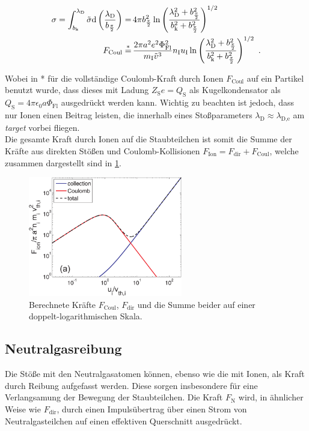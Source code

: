 \documentclass[numbers=noenddot,a4paper]{scrartcl}
\newcommand{\diff}{\textnormal{d}}
\newcommand{\ix}[1]{_\text{#1}}
\newcommand{\tilt}[1]{\textit{#1}}
\begin{document}
					\begin{align}
						\sigma=\int_{b\ix{k}}^{\lambda\ix{D}}\tilde{\sigma}\diff\left(\frac{\lambda\ix{D}}{b_{\frac{\pi}{2}}}\right)=&\,4\pi b_{\frac{\pi}{2}}^2\ln\left(\frac{\lambda\ix{D}^2+b_{\frac{\pi}{2}}^2}{b\ix{k}^2+b_{\frac{\pi}{2}}^2}\right)^{1/2} \nonumber \\
						F\ix{Coul}\overset{*}{=}&\,\frac{2\pi a^2 e^2\Phi\ix{Fl}^2}{m\ix{I}\tilde{v}^3}n\ix{I}u\ix{I}\ln\left(\frac{\lambda\ix{D}^2+b_{\frac{\pi}{2}}^2}{b\ix{k}^2+b_{\frac{\pi}{2}}^2}\right)^{1/2} \, \, .
					\end{align}
					
				Wobei in * für die vollständige Coulomb-Kraft durch Ionen $F\ix{Coul}$ auf ein Partikel benutzt wurde, dass dieses mit Ladung $Z\ix{S}e=Q\ix{S}$ als Kugelkondensator als $Q\ix{S}=4\pi\epsilon\ix{0}a\Phi\ix{Fl}$ ausgedrückt werden kann. Wichtig zu beachten ist jedoch, dass nur Ionen einen Beitrag leisten, die innerhalb eines Stoßparameters $\lambda\ix{D}\approx\lambda\ix{D,e}$ am \tilt{target} vorbei fliegen.\\
				Die gesamte Kraft durch Ionen auf die Staubteilchen ist somit die Summe der Kräfte aus direkten Stößen und Coulomb-Kollisionen $F\ix{Ion}=F\ix{dir}+F\ix{Coul}$, welche zusammen dargestellt sind in \ref{img:ionkräfte}.
				
					\begin{figure}
						\centering
						\includegraphics[height=0.4\textwidth,width=0.6\textwidth]{figs/forcesandtrappingmelzer.png}
						\caption{Berechnete Kräfte $F\ix{Coul}$, $F\ix{dir}$ und die Summe beider auf einer doppelt-logarithmischen Skala.}\label{img:ionkräfte}
					\end{figure}
					
			\subsection{Neutralgasreibung}
			
				Die Stöße mit den Neutralgasatomen können, ebenso wie die mit Ionen, als Kraft durch Reibung aufgefasst werden. Diese sorgen insbesondere für eine Verlangsamung der Bewegung der Staubteilchen. Die Kraft $F\ix{N}$ wird, in ähnlicher Weise wie $F\ix{dir}$, durch einen Impulsübertrag über einen Strom von Neutralgasteilchen auf einen effektiven Querschnitt ausgedrückt.
				
\end{document}
